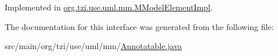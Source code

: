 Implemented in \hyperlink{classorg_1_1tzi_1_1use_1_1uml_1_1mm_1_1_m_model_element_impl_ace1ff71302c213e036e94e285a7e7e56}{org.\-tzi.\-use.\-uml.\-mm.\-M\-Model\-Element\-Impl}.



The documentation for this interface was generated from the following file\-:\begin{DoxyCompactItemize}
\item 
src/main/org/tzi/use/uml/mm/\hyperlink{_annotatable_8java}{Annotatable.\-java}\end{DoxyCompactItemize}
